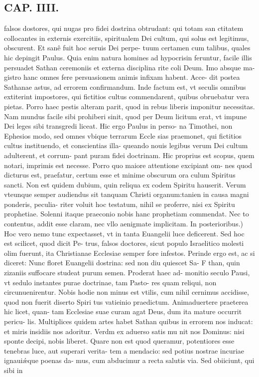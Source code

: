 \documentclass{article}
\begin{document}
\begin{pages}
\section*{CAP. IIII. }
\marginpar{[ p.42 ]}\pstart falsos dostores, qui nugas pro fidei dostrina obtrudant: qui totam san ctitatem collocantes in externis exercitiis, spiritualem Dei cultum, qui solus est legitimus, obscurent. Et sanê fuit hoc seruis Dei perpe- tuum certamen cum talibus, quales hic depingit Paulus. Quia enim natura homines ad hypocrisin feruntur, facile illis persuadet Sathan ceremoniis et externa disciplina rite coli Deum. Imo absque ma- gistro hanc omnes fere persuasionem animis infixam habent. Acce- dit postea Sathanae astus, ad errorem confirmandum. Inde factum est, vt seculis omnibus extiterint impostores, qui fictitios cultus commendarent, quibus obruebatur vera pietas. Porro haec pestis alteram parit, quod in rebus liberis imponitur necessitas. Nam mundus facile sibi prohiberi sinit, quod per Deum licitum erat, vt impune Dei leges sibi transgredi liceat. Hic ergo Paulus in perso- na Timothei, non Ephesios modo, sed omnes vbique terrarum Eccle sias praemonet, qui fictitios cultus instituendo, et conscientias illa- queando nouis legibus verum Dei cultum adulterent, et corrum- pant puram fidei doctrinam. Hic proprius est scopus, quem notari, imprimis est necesse. Porro quo maiore attentione excipiant om- nes quod dicturus est, praefatur, certum esse et minime obscurum ora culum Spiritus sancti. Non est quidem dubium, quin reliqua ex codem Spiritu hauserit. Verum vteunque semper audiendus sit tanquam Christi organum:tanien in causa magni ponderis, peculia- riter voluit hoc testatum, nihil se proferre, nisi ex Spiritu prophetiae. Solenni itaque praeconio nobis hanc prophetiam commendat. Nec to contentus, addit esse claram, nec vllo aenigmate implicitam.  \pend\pstart In posterioribus.) Hoc vero nemo tunc expectasset, vt in tanta Euangelii luce deficerent. Sed hoc est scilicet, quod dicit Pe- trus, falsos doctores, sicut populo Israelitico molesti olim fuerunt, ita Christianae Ecclesiae semper fore infestos. Perinde ergo est, ac si diceret: Nunc floret Euangelii dostrina: sed non diu quiescet Sa- F than, quin zizaniis suffocare studeat purum semen. Proderat haec ad- monitio seculo Pausi, vt sedulo instantes purae doctrinae, tam Pasto- res quam reliqui, non circunuenirentur. Nobis hodie non minus est vtilis, cum nihil cernimus accidisse, quod non fuerit diserto Spiri tus vatieinio praedictum. Animaduertere praeterea hic licet, quan- tam Ecclesiae suae curam agat Deus, dum ita mature occurrit pericu- lis. Multiplices quidem artes habet Sathan quibus in errorem nos inducat: et miris insidiis nos adoritur. Verdm ex aduerso satis mu nit nos Dominus: nisi sponte decipi, nobis liberet. Quare non est quod queramur, potentiores esse tenebras luce, aut superari verita- tem a mendacio: sed potius nostrae incuriae ignauiǽque poenas da- mus, cum abducimur a recta salutis via. Sed obiiciunt, qui sibi in  \pend

\end{pages}
\end{document}

